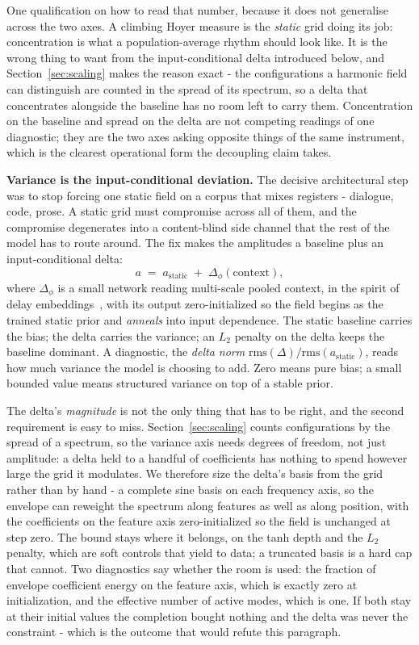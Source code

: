 One qualification on how to read that number, because it does not generalise across the two axes. A climbing Hoyer measure is the \textit{static} grid doing its job: concentration is what a population-average rhythm should look like. It is the wrong thing to want from the input-conditional delta introduced below, and Section~\ref{sec:scaling} makes the reason exact - the configurations a harmonic field can distinguish are counted in the spread of its spectrum, so a delta that concentrates alongside the baseline has no room left to carry them. Concentration on the baseline and spread on the delta are not competing readings of one diagnostic; they are the two axes asking opposite things of the same instrument, which is the clearest operational form the decoupling claim takes.

\paperSpectrumFigure{}

\textbf{Variance is the input-conditional deviation.} The decisive architectural step was to stop forcing one static field on a corpus that mixes registers - dialogue, code, prose. A static grid must compromise across all of them, and the compromise degenerates into a content-blind side channel that the rest of the model has to route around. The fix makes the amplitudes a baseline plus an input-conditional delta:
\[
    a \;=\; a_{\text{static}} \;+\; \Delta_\phi(\text{context}),
\]
where $\Delta_\phi$ is a small network reading multi-scale pooled context, in the spirit of delay embeddings~\cite{takens1981}, with its output zero-initialized so the field begins as the trained static prior and \textit{anneals} into input dependence. The static baseline carries the bias; the delta carries the variance; an $L_2$ penalty on the delta keeps the baseline dominant. A diagnostic, the \emph{delta norm} $\mathrm{rms}(\Delta)/\mathrm{rms}(a_{\text{static}})$, reads how much variance the model is choosing to add. Zero means pure bias; a small bounded value means structured variance on top of a stable prior.

The delta's \textit{magnitude} is not the only thing that has to be right, and the second requirement is easy to miss. Section~\ref{sec:scaling} counts configurations by the spread of a spectrum, so the variance axis needs degrees of freedom, not just amplitude: a delta held to a handful of coefficients has nothing to spend however large the grid it modulates. We therefore size the delta's basis from the grid rather than by hand - a complete sine basis on each frequency axis, so the envelope can reweight the spectrum along features as well as along position, with the coefficients on the feature axis zero-initialized so the field is unchanged at step zero. The bound stays where it belongs, on the tanh depth and the $L_2$ penalty, which are soft controls that yield to data; a truncated basis is a hard cap that cannot. Two diagnostics say whether the room is used: the fraction of envelope coefficient energy on the feature axis, which is exactly zero at initialization, and the effective number of active modes, which is one. If both stay at their initial values the completion bought nothing and the delta was never the constraint - which is the outcome that would refute this paragraph.

